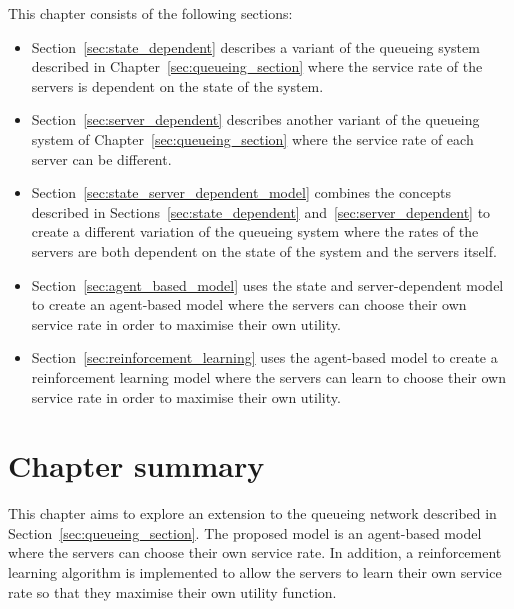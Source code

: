 This chapter consists of the following sections:
\begin{itemize}
    \item Section~\ref{sec:state_dependent} describes a variant of the queueing
    system described in Chapter~\ref{sec:queueing_section} where the service
    rate of the servers is dependent on the state of the system.
    \item Section~\ref{sec:server_dependent} describes another variant of the
    queueing system of Chapter~\ref{sec:queueing_section} where the service
    rate of each server can be different.
    \item Section~\ref{sec:state_server_dependent_model} combines the concepts
    described in Sections~\ref{sec:state_dependent}
    and~\ref{sec:server_dependent} to create a different variation of the
    queueing system where the rates of the servers are both dependent on the
    state of the system and the servers itself.
    \item Section~\ref{sec:agent_based_model} uses the state and
    server-dependent model to create an agent-based model where the servers
    can choose their own service rate in order to maximise their own utility.
    \item Section~\ref{sec:reinforcement_learning} uses the agent-based model
    to create a reinforcement learning model where the servers can learn to
    choose their own service rate in order to maximise their own utility.
\end{itemize}













\section{Chapter summary}

This chapter aims to explore an extension to the queueing network described in
Section~\ref{sec:queueing_section}.
The proposed model is an agent-based model where the servers can choose their
own service rate.
In addition, a reinforcement learning algorithm is implemented to allow the
servers to learn their own service rate so that they maximise their own utility
function.

